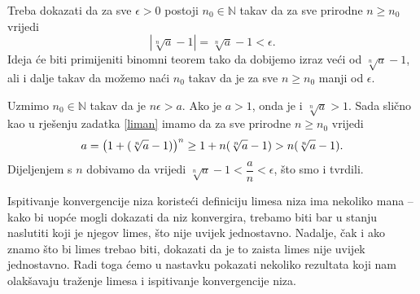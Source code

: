 \documentclass{book}
\let\originalleft\left
\let\originalright\right
\renewcommand{\left}{\mathopen{}\mathclose\bgroup\originalleft}
\renewcommand{\right}{\aftergroup\egroup\originalright}
\renewenvironment{proof}{%
    \vspace{-\parskip}\begin{oldproof}%
    }{%
    \end{oldproof}%
}
\theoremstyle{definition}
\theoremstyle{definition}
\theoremstyle{remark}
\begin{document}
\begin{proof}[Rješenje]
Treba dokazati da za sve $\epsilon>0$ postoji $n_0\in \mathbb{N}$ takav da za sve prirodne $n\geq n_0$ vrijedi
$$|\sqrt[n]{a}-1|=\sqrt[n]{a}-1<\epsilon.$$
Ideja će biti primijeniti binomni teorem tako da dobijemo izraz veći od $\sqrt[n]{a}-1$, ali i dalje takav da možemo naći $n_0$ takav da je za sve $n\geq n_0$ manji od $\epsilon$.

Uzmimo $n_0\in \mathbb{N}$ takav da je $n\epsilon>a$. Ako je $a>1$, onda je i $\sqrt[n]{a}>1$. Sada slično kao u rješenju zadatka \ref{liman} imamo da za sve prirodne $n\geq n_0$ vrijedi
$$a=\left(1+(\sqrt[n]{a}-1)\right)^n\geq 1+n(\sqrt[n]{a}-1)>n(\sqrt[n]{a}-1).$$
Dijeljenjem s $n$ dobivamo da vrijedi $\sqrt[n]{a}-1<\dfrac{a}{n}<\epsilon$, što smo i tvrdili.
\end{proof}

Ispitivanje konvergencije niza koristeći definiciju limesa niza ima nekoliko mana -- kako bi uopće mogli dokazati da niz konvergira, trebamo biti bar u stanju naslutiti koji je njegov limes, što nije uvijek jednostavno. Nadalje, čak i ako znamo što bi limes trebao biti, dokazati da je to zaista limes nije uvijek jednostavno. Radi toga ćemo u nastavku pokazati nekoliko rezultata koji nam olakšavaju traženje limesa i ispitivanje konvergencije niza.
\end{document}
